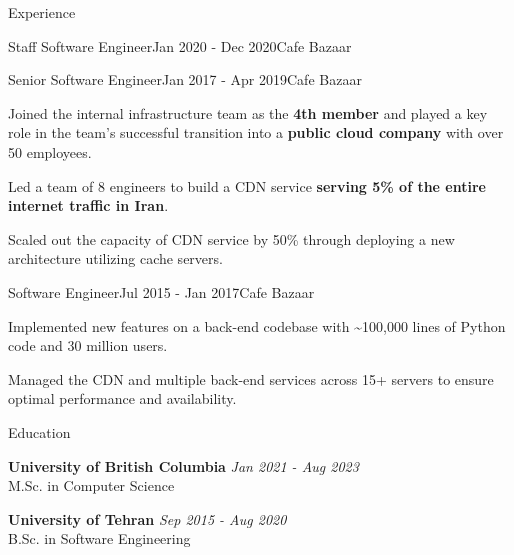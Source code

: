 \documentclass[
	10pt, %
]{resume} %
\begin{document}
\begin{rSection}{Experience}
\begin{rSubsection}{Staff Software Engineer}{Jan 2020 - Dec 2020}{Cafe Bazaar}{}
  \end{rSubsection}

  \begin{rSubsection}{Senior Software Engineer}{Jan 2017 - Apr 2019}{Cafe Bazaar}{}

    \item Joined the internal infrastructure team as the \textbf{4th member} and
      played a key role in the team's successful transition into a
      \textbf{public cloud company} with over 50 employees.

    \item Led a team of 8 engineers to build a CDN service \textbf{serving 5\%
      of the entire internet traffic in Iran}.

    \item Scaled out the capacity of CDN service by 50\% through deploying a new
      architecture utilizing cache servers.

  \end{rSubsection}

  \begin{rSubsection}{Software Engineer}{Jul 2015 - Jan 2017}{Cafe Bazaar}{}
    
    \item Implemented new features on a back-end codebase with \textasciitilde 100,000 lines
      of Python code and 30 million users.

    \item Managed the CDN and multiple back-end services across 15+ servers to
      ensure optimal performance and availability.

  \end{rSubsection}

\end{rSection}


\begin{rSection}{Education}
	
  \textbf{University of British Columbia} \hfill \textit{Jan 2021 - Aug 2023} \\ 
	M.Sc. in Computer Science

  \textbf{University of Tehran} \hfill \textit{Sep 2015 - Aug 2020} \\ 
	B.Sc. in Software Engineering
\end{rSection}

\end{document}
